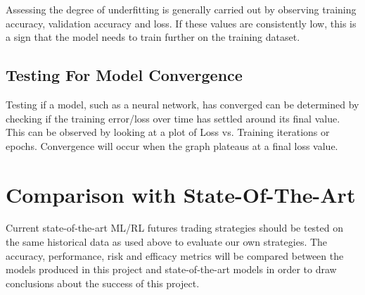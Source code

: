 Assessing the degree of underfitting is generally carried out by observing training accuracy, validation accuracy and loss. If these values are consistently low, this is a sign that the model needs to train further on the training dataset.

\subsection{Testing For Model Convergence}
Testing if a model, such as a neural network, has converged can be determined by checking if the training error/loss over time has settled around its final value. This can be observed by looking at a plot of Loss vs. Training iterations or epochs. Convergence will occur when the graph plateaus at a final loss value.
\section{Comparison with State-Of-The-Art}
Current state-of-the-art ML/RL futures trading strategies should be tested on the same historical data as used above to evaluate our own strategies. The accuracy, performance, risk and efficacy metrics will be compared between the models produced in this project and state-of-the-art models in order to draw conclusions about the success of this project.